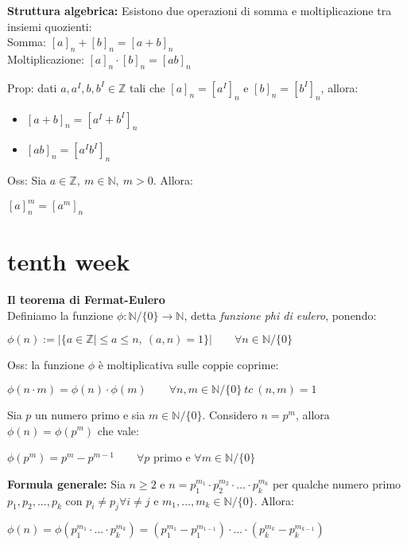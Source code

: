 \documentclass[11pt, letterpaper]{article}
\begin{document}
\textbf{Struttura algebrica:} Esistono due operazioni di somma e moltiplicazione tra insiemi quozienti:\\
Somma: $[a]_{n}+[b]_{n}=[a+b]_{n}$\\
Moltiplicazione: $[a]_{n}\cdot[b]_{n}=[ab]_{n}$

Prop: dati $a,a^{I},b,b^{I}\in\mathbb{Z}$ tali che $[a]_{n}=[a^{I}]_{n}$ e $[b]_{n}=[b^{I}]_{n}$, allora:
\begin{itemize}
    \item $[a+b]_{n}=[a^{I}+b^{I}]_{n}$
    \item $[ab]_{n}=[a^{I}b^{I}]_{n}$
\end{itemize}

Oss: Sia $a\in\mathbb{Z},\ m\in\mathbb{N},\ m>0$. Allora:
\begin{center}
    $[a]_{n}^{m}=[a^{m}]_{n}$
\end{center}

\newpage
\section{tenth week}
\textbf{Il teorema di Fermat-Eulero}\\Definiamo la funzione $\phi:\mathbb{N}/\{0\}\rightarrow\mathbb{N}$, detta
\textit{funzione phi di eulero}, ponendo:
\begin{center}
    $\phi(n):=|\{a\in\mathbb{Z}\mid \leq a\leq n,\ (a,n)=1\}|\qquad\forall n\in\mathbb{N}/\{0\}$
\end{center}

Oss: la funzione $\phi$ è moltiplicativa sulle coppie coprime:
\begin{center}
    $\phi(n\cdot m)=\phi(n)\cdot\phi(m)\qquad \forall n,m\in\mathbb{N}/\{0\}\ tc\ (n,m)=1$
\end{center}

Sia $p$ un numero primo e sia $m\in\mathbb{N}/\{0\}$. Considero $n=p^{m}$, allora $\phi(n)=\phi(p^{m})$ che vale:
\begin{center}
    $\phi(p^{m})=p^{m}-p^{m-1}\qquad \forall p$ primo e $\forall m\in\mathbb{N}/\{0\}$
\end{center}

\textbf{Formula generale:} Sia $n\geq 2$ e $n=p_{1}^{m_{1}}\cdot p_{2}^{m_{2}}\cdot...\cdot p_{k}^{m_{k}}$ per 
qualche numero primo $p_{1},p_{2},...,p_{k}$ con $p_{i}\neq p_{j} \forall i\neq j$ e $m_{1},...,m_{k}\in\mathbb{N}
/\{0\}$. Allora:
\begin{center}
    $\phi(n)=\phi(p_{1}^{m_{1}}\cdot ... \cdot p_{k}^{m_{k}})=(p_{1}^{m_{1}}-p_{1}^{m_{1-1}})\cdot ... \cdot
    (p_{k}^{m_{k}}-p_{k}^{m_{k-1}})$
\end{center}
\end{document}
